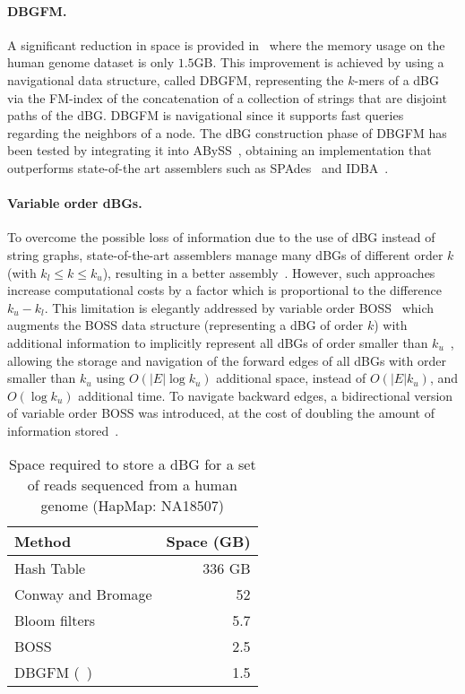 \documentclass[11pt,oneside,a4paper]{article}
\begin{document}
\paragraph{DBGFM.}
A significant reduction in space is provided in~\cite{Medvedev14} 
where the memory usage on the human genome dataset is only $1.5$GB.
This improvement is achieved by using a navigational data structure, 
called DBGFM, representing the $k$-mers of a dBG via the FM-index of the concatenation of a collection of strings that are disjoint paths of the dBG.
DBGFM is navigational since it supports fast queries regarding the neighbors of a node. 
The  dBG construction phase  of  DBGFM  has been tested by integrating it into ABySS~\cite{Simpson2009}, obtaining an implementation  that outperforms state-of-the art assemblers such as   SPAdes~\cite{bankevich2012spades/long} and IDBA~\cite{Peng2010}.

\paragraph{Variable order dBGs.}
To overcome the possible loss of information due to the use of dBG instead of string graphs, 
state-of-the-art assemblers manage many dBGs 
of different order $k$ (with  $k_l \le k \le k_u$), resulting in a better  assembly~\cite{bankevich2012spades/long,Peng2010}. 
However, such approaches increase  computational 
costs by a factor which is proportional to the difference $k_u - k_l$.
This limitation is elegantly addressed by  variable order
BOSS~\cite{DBLP:conf/latin/BelazzouguiGMPP16} which augments the BOSS data structure (representing a dBG of order $k$) with additional information to implicitly represent all dBGs of order smaller than $k_u$~\cite{DBLP:conf/latin/BelazzouguiGMPP16}, allowing the storage and navigation of the forward edges of all dBGs with order smaller than $k_u$ using $O(|E|\log k_u)$ additional space, instead of $O(|E| k_u)$, and $O(\log k_u)$ additional time. To navigate backward edges, a bidirectional version of variable order BOSS was introduced, at the cost of doubling the amount of information stored~\cite{DBLP:conf/latin/BelazzouguiGMPP16}.


\begin{table}
\caption{Space required to store a dBG for a set of reads sequenced
  from a human genome (HapMap: NA18507)}
\begin{center}
  \begin{tabular}[c]{lr}
    Method & Space (GB) \\
    \midrule
    Hash Table  &  336 GB \\
    Conway and Bromage & 52 \\
    Bloom filters & 5.7 \\
    BOSS & 2.5 \\
    DBGFM (~\cite{Medvedev14}) &  1.5 \\
  \end{tabular}
\end{center}
\label{table2}
\end{table}
\end{document}
